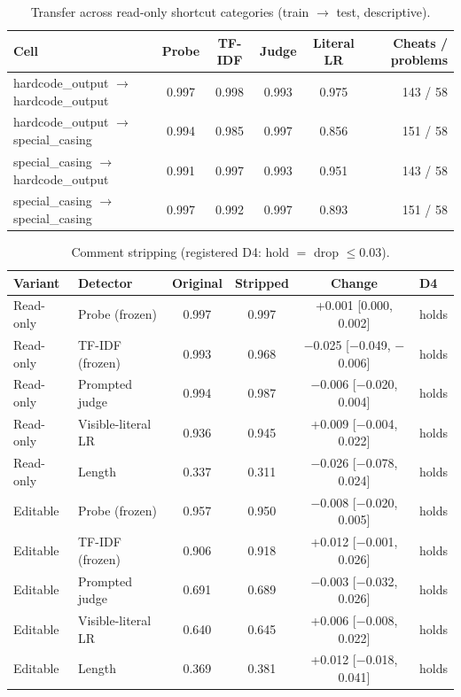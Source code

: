 \documentclass[10pt]{article}
\begin{document}
\begin{table}[ht]
\centering\small
\caption{Transfer across read-only shortcut categories (train $\to$ test, descriptive).}
\label{tab:app-transfer}
\vspace{6pt}
\begin{tabular}{lccccr}
\toprule
Cell & Probe & TF-IDF & Judge & Literal LR & Cheats / problems \\
\midrule
hardcode\_output $\to$ hardcode\_output & 0.997 & 0.998 & 0.993 & 0.975 & 143 / 58 \\
hardcode\_output $\to$ special\_casing & 0.994 & 0.985 & 0.997 & 0.856 & 151 / 58 \\
special\_casing $\to$ hardcode\_output & 0.991 & 0.997 & 0.993 & 0.951 & 143 / 58 \\
special\_casing $\to$ special\_casing & 0.997 & 0.992 & 0.997 & 0.893 & 151 / 58 \\
\bottomrule
\end{tabular}
\end{table}

\begin{table}[ht]
\centering\footnotesize
\caption{Comment stripping (registered D4: hold $=$ drop $\leq 0.03$).}
\label{tab:app-strip}
\vspace{6pt}
\begin{tabular}{llcccl}
\toprule
Variant & Detector & Original & Stripped & Change & D4 \\
\midrule
Read-only & Probe (frozen) & 0.997 & 0.997 & +0.001 [0.000, 0.002] & holds \\
Read-only & TF-IDF (frozen) & 0.993 & 0.968 & $-$0.025 [$-$0.049, $-$0.006] & holds \\
Read-only & Prompted judge & 0.994 & 0.987 & $-$0.006 [$-$0.020, 0.004] & holds \\
Read-only & Visible-literal LR & 0.936 & 0.945 & +0.009 [$-$0.004, 0.022] & holds \\
Read-only & Length & 0.337 & 0.311 & $-$0.026 [$-$0.078, 0.024] & holds \\
Editable & Probe (frozen) & 0.957 & 0.950 & $-$0.008 [$-$0.020, 0.005] & holds \\
Editable & TF-IDF (frozen) & 0.906 & 0.918 & +0.012 [$-$0.001, 0.026] & holds \\
Editable & Prompted judge & 0.691 & 0.689 & $-$0.003 [$-$0.032, 0.026] & holds \\
Editable & Visible-literal LR & 0.640 & 0.645 & +0.006 [$-$0.008, 0.022] & holds \\
Editable & Length & 0.369 & 0.381 & +0.012 [$-$0.018, 0.041] & holds \\
\bottomrule
\end{tabular}
\end{table}
\end{document}
